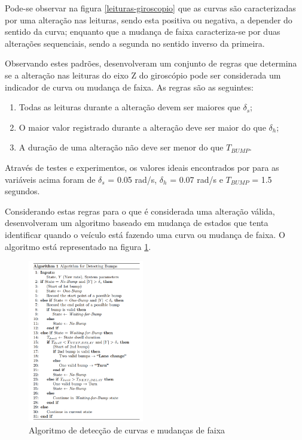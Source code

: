 Pode-se observar na figura \ref{leituras-giroscopio} que as curvas são caracterizadas por uma alteração nas leituras, sendo esta positiva ou negativa,
a depender do sentido da curva; enquanto que a mudança de faixa caracteriza-se por duas alterações sequenciais, sendo a segunda no sentido inverso
da primeira.

Observando estes padrões,  desenvolveram um conjunto de regras que determina se a alteração nas leituras do eixo Z do
giroscópio pode ser considerada um indicador de curva ou mudança de faixa. As regras são as seguintes:

\begin{enumerate}
  \item Todas as leituras durante a alteração devem ser maiores que $\delta_{s}$;
  \item O maior valor registrado durante a alteração deve ser maior do que $\delta_{h}$;
  \item A duração de uma alteração não deve ser menor do que $T_{BUMP}$.
\end{enumerate}

Através de testes e experimentos, os valores ideais encontrados por  para as variáveis acima foram de $\delta_{s}$ = 0.05 rad/s,
$\delta_{h}$ = 0.07 rad/s e $T_{BUMP}$ = 1.5 segundos.

Considerando estas regras para o que é considerada uma alteração válida,  desenvolveram um algoritmo baseado em mudança de estados
que tenta identificar quando o veículo está fazendo uma curva ou mudança de faixa. O algoritmo está representado na figura \ref{algoritmo-giroscopio}.

\begin{figure}[h]
  \centering
  \includegraphics[width=0.45\textwidth]{images/algoritmo-giroscopio.png}
  \caption{Algoritmo de detecção de curvas e mudanças de faixa \cite{chen2015invisible}}
  \label{algoritmo-giroscopio}
\end{figure}

